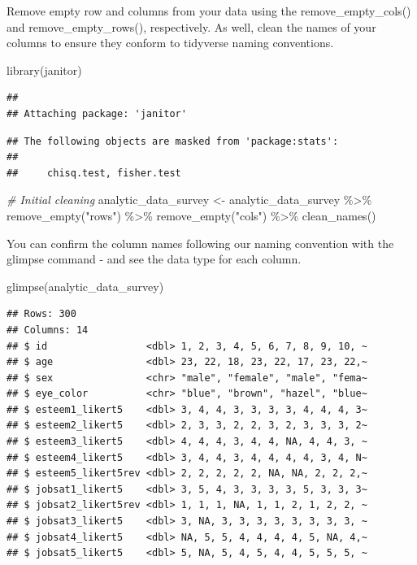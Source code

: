 \documentclass[
]{krantz}
\makeatletter
\newenvironment{Shaded}{\begin{snugshade}}{\end{snugshade}}
\newcommand{\CommentTok}[1]{\textcolor[rgb]{0.37,0.37,0.37}{\textit{#1}}}
\newcommand{\FunctionTok}[1]{\textcolor[rgb]{0,0,0}{#1}}
\newcommand{\NormalTok}[1]{#1}
\newcommand{\OtherTok}[1]{\textcolor[rgb]{0.37,0.37,0.37}{#1}}
\newcommand{\SpecialCharTok}[1]{\textcolor[rgb]{0,0,0}{#1}}
\newcommand{\StringTok}[1]{\textcolor[rgb]{0.5,0.5,0.5}{#1}}
\newenvironment{kframe}{%
\medskip{}
\setlength{\fboxsep}{.8em}
 \def\at@end@of@kframe{}%
 \ifinner\ifhmode%
  \def\at@end@of@kframe{\end{minipage}}%
  \begin{minipage}{\columnwidth}%
 \fi\fi%
 \def\FrameCommand##1{\hskip\@totalleftmargin \hskip-\fboxsep
 \colorbox{shadecolor}{##1}\hskip-\fboxsep
     \hskip-\linewidth \hskip-\@totalleftmargin \hskip\columnwidth}%
 \MakeFramed {\advance\hsize-\width
   \@totalleftmargin\z@ \linewidth\hsize
   \@setminipage}}%
 {\par\unskip\endMakeFramed%
 \at@end@of@kframe}
\renewenvironment{Shaded}{\begin{kframe}}{\end{kframe}}
\makeatother
\begin{document}
Remove empty row and columns from your data using the remove\_empty\_cols() and remove\_empty\_rows(), respectively. As well, clean the names of your columns to ensure they conform to tidyverse naming conventions.

\begin{Shaded}
\begin{Highlighting}[]
\FunctionTok{library}\NormalTok{(janitor)}
\end{Highlighting}
\end{Shaded}

\begin{verbatim}
## 
## Attaching package: 'janitor'
\end{verbatim}

\begin{verbatim}
## The following objects are masked from 'package:stats':
## 
##     chisq.test, fisher.test
\end{verbatim}

\begin{Shaded}
\begin{Highlighting}[]
\CommentTok{\# Initial cleaning}
\NormalTok{analytic\_data\_survey }\OtherTok{\textless{}{-}}\NormalTok{ analytic\_data\_survey }\SpecialCharTok{\%\textgreater{}\%}
  \FunctionTok{remove\_empty}\NormalTok{(}\StringTok{"rows"}\NormalTok{) }\SpecialCharTok{\%\textgreater{}\%}
  \FunctionTok{remove\_empty}\NormalTok{(}\StringTok{"cols"}\NormalTok{) }\SpecialCharTok{\%\textgreater{}\%}
  \FunctionTok{clean\_names}\NormalTok{()}
\end{Highlighting}
\end{Shaded}

You can confirm the column names following our naming convention with the glimpse command - and see the data type for each column.

\begin{Shaded}
\begin{Highlighting}[]
\FunctionTok{glimpse}\NormalTok{(analytic\_data\_survey)}
\end{Highlighting}
\end{Shaded}

\begin{verbatim}
## Rows: 300
## Columns: 14
## $ id                 <dbl> 1, 2, 3, 4, 5, 6, 7, 8, 9, 10, ~
## $ age                <dbl> 23, 22, 18, 23, 22, 17, 23, 22,~
## $ sex                <chr> "male", "female", "male", "fema~
## $ eye_color          <chr> "blue", "brown", "hazel", "blue~
## $ esteem1_likert5    <dbl> 3, 4, 4, 3, 3, 3, 3, 4, 4, 4, 3~
## $ esteem2_likert5    <dbl> 2, 3, 3, 2, 2, 3, 2, 3, 3, 3, 2~
## $ esteem3_likert5    <dbl> 4, 4, 4, 3, 4, 4, NA, 4, 4, 3, ~
## $ esteem4_likert5    <dbl> 3, 4, 4, 3, 4, 4, 4, 4, 3, 4, N~
## $ esteem5_likert5rev <dbl> 2, 2, 2, 2, 2, NA, NA, 2, 2, 2,~
## $ jobsat1_likert5    <dbl> 3, 5, 4, 3, 3, 3, 3, 5, 3, 3, 3~
## $ jobsat2_likert5rev <dbl> 1, 1, 1, NA, 1, 1, 2, 1, 2, 2, ~
## $ jobsat3_likert5    <dbl> 3, NA, 3, 3, 3, 3, 3, 3, 3, 3, ~
## $ jobsat4_likert5    <dbl> NA, 5, 5, 4, 4, 4, 4, 5, NA, 4,~
## $ jobsat5_likert5    <dbl> 5, NA, 5, 4, 5, 4, 4, 5, 5, 5, ~
\end{verbatim}
\end{document}
